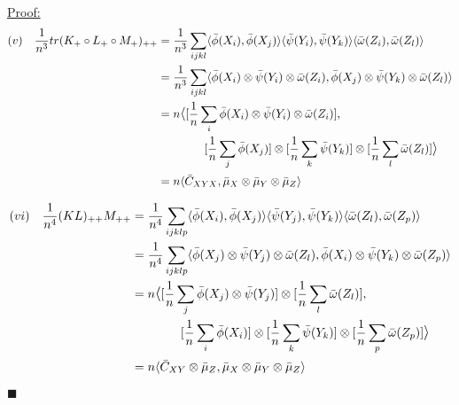 \documentclass[12pt]{article}
\newenvironment{claimproof}[1]{\par\noindent\underline{Proof:}\space#1}{\hfill $\blacksquare$}
\numberwithin{claim}{section}
\numberwithin{lemma}{section}
\numberwithin{theorem}{section}
\begin{document}
\begin{claimproof}
\begin{align*}
(v) && \frac{1}{n^3}tr(K_{+} \circ L_{+} \circ M_{+})_{++} &= \frac{1}{n^3} \sum_{ijkl} \langle \bar{\phi}(X_i),\bar{\phi}(X_j) \rangle  \langle \bar{\psi}(Y_i),\bar{\psi}(Y_k) \rangle  \langle \bar{\omega}(Z_i),\bar{\omega}(Z_l) \rangle\\
&&& =\frac{1}{n^3} \sum_{ijkl} \langle \bar{\phi}(X_i)\otimes\bar{\psi}(Y_i) \otimes  \bar{\omega}(Z_i),\bar{\phi}(X_j)\otimes \bar{\psi}(Y_k) \otimes \bar{\omega}(Z_l) \rangle\\
&&& = n  \mathlarger{\langle} [\frac{1}{n} \sum_{i}\bar{\phi}(X_i)\otimes\bar{\psi}(Y_i) \otimes  \bar{\omega}(Z_i)],\\&&&\quad\quad\quad\quad[\frac{1}{n}\sum_{j}\bar{\phi}(X_j)]\otimes  [\frac{1}{n} \sum_k \bar{\psi}(Y_k)] \otimes[\frac{1}{n} \sum_l  \bar{\omega}(Z_l)]\mathlarger{\rangle}\\
&&& = n\langle \bar{C}_{XYX},\bar{\mu}_X \otimes \bar{\mu}_Y  \otimes\bar{\mu}_Z  \rangle\\
\end{align*}

\begin{align*}
(vi) && \frac{1}{n^4}(KL)_{++}M_{++} &= \frac{1}{n^4} \sum_{ijklp} \langle \bar{\phi}(X_i),\bar{\phi}(X_j) \rangle  \langle \bar{\psi}(Y_j),\bar{\psi}(Y_k) \rangle  \langle \bar{\omega}(Z_l),\bar{\omega}(Z_p) \rangle\\
&&& =\frac{1}{n^4} \sum_{ijklp} \langle \bar{\phi}(X_j)\otimes\bar{\psi}(Y_j) \otimes  \bar{\omega}(Z_l),\bar{\phi}(X_i)\otimes \bar{\psi}(Y_k) \otimes \bar{\omega}(Z_p) \rangle\\
&&& = n  \mathlarger{\langle} [\frac{1}{n} \sum_{j}\bar{\phi}(X_j)\otimes\bar{\psi}(Y_j)] \otimes  [\frac{1}{n} \sum_{l} \bar{\omega}(Z_l)],\\&&&\quad\quad\quad\quad[\frac{1}{n}\sum_{i}\bar{\phi}(X_i)]\otimes  [\frac{1}{n} \sum_k \bar{\psi}(Y_k)] \otimes[\frac{1}{n} \sum_p  \bar{\omega}(Z_p)]\mathlarger{\rangle}\\
&&& = n\langle \bar{C}_{XY}\otimes \bar{\mu}_Z,\bar{\mu}_X \otimes \bar{\mu}_Y  \otimes\bar{\mu}_Z  \rangle\\
\end{align*}



\end{claimproof}
\end{document}
